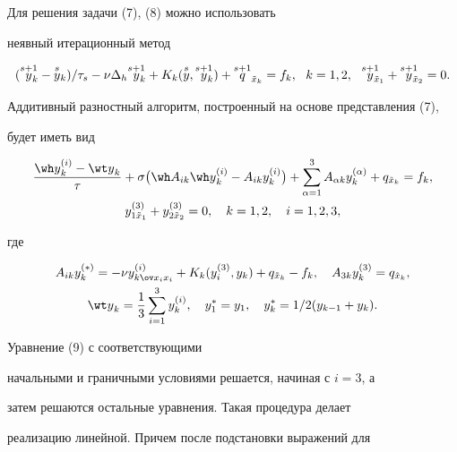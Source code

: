 Для решения задачи (7), (8) можно использовать


неявный итерационный метод


$$


(\yssk-\ysk)/\tau_s-\nu\Delta_h\yssk+K_k(\overset{s}{y}{},\yssk)+


\overset{s+1}{q}_{\Tilde x_k}=f_k,


\ \ k=1,2,\ \  \overset{s+1}{y}_{\!\!\!\Tilde x_1}+


\overset{s+1}{y}_{\!\!\!\Tilde x_2}=0.


$$


Аддитивный разностный алгоритм, построенный на основе представления (7),


будет иметь вид


\begin{gather}


\frac{{\wh y}_k^{(i)}-{\wt


y}_k}{\tau}+\sigma \big({\wh A}_{ik} {\wh y}_k^{(i)}-A_{ik}


y_k^{(i)}\big)+\sum_{\alpha=1}^3 A_{\alpha k}


y_k^{(\alpha)}+q_{\tilde x_k}=f_k,\\


%


y_{1\tilde x_1}^{(3)}+y_{2\tilde x_2}^{(3)}=0,\quad k=1, 2,\quad


i=1, 2, 3,\notag


\end{gather}


где


\begin{gather*}


A_{ik} y_k^{(*)}=-\nu y_{k {\ov x}_i


x_i}^{(i)}+K_k(y_i^{(3)}, y_k)+q_{\tilde x_k}-


f_k,\quad A_{3 k} y_k^{(3)}=q_{{\hat x}_k},\\


%


{\wt y}_k=\frac{1}{3}\sum_{i=1}^3 y_k^{(i)},\quad y_1^{*}=y_1,


\quad y_k^*=1/2(y_{k-1}+y_k).


\end{gather*}


Уравнение (9) с соответствующими


начальными и граничными условиями решается, начиная с $i=3$, а


затем решаются остальные уравнения. Такая процедура делает


реализацию линейной. Причем после подстановки выражений для


